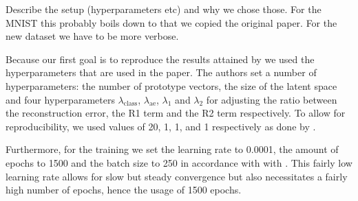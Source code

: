 Describe the setup (hyperparameters etc) and why we chose those. For the MNIST this probably boils down to that we copied the original paper. For the new dataset we have to be more verbose.

Because our first goal is to reproduce the results attained by \cite{li2018deep} we used the hyperparameters that are used in the paper. The authors set a number of hyperparameters: the number of prototype vectors, the size of the latent space and four hyperparameters $\lambda_{\text{class}}$, $\lambda_{\text{ae}}$, $\lambda_1$ and $\lambda_2$ for adjusting the ratio between the reconstruction error, the R1 term and the R2 term respectively. To allow for reproducibility, we used values of 20, 1, 1, and 1 respectively as done by \cite{li2018deep}.

Furthermore, for the training we set the learning rate to 0.0001, the amount of epochs to 1500 and the batch size to 250 in accordance with with \cite{li2018deep}. This fairly low learning rate allows for slow but steady convergence but also necessitates a fairly high number of epochs, hence the usage of 1500 epochs. 